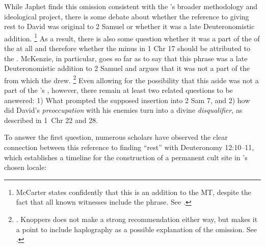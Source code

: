 While Japhet finds this omission consistent with the \chronicler's broader methodology and ideological project,%
    \autocite[328]{japhet1993}
there is some debate about whether the reference to \yahweh giving rest to David was original to 2 Samuel or whether it was a late Deuteronomistic addition.%
    \footnote{McCarter states confidently that this is an addition to the MT, despite the fact that all known witnesses include the phrase. See \cite[191]{mccarter1984}.}
As a result, there is also some question whether it was a part of the \vorlage of the \chronicler at all and therefore whether the minus in 1 Chr 17 should be attributed to the \chronicler. McKenzie, in particular, goes so far as to say that this phrase was a late Deuteronomistic addition to 2 Samuel and argues that it was not a part of the \vorlage from which the \chronicler drew.%
    \footnote{\Cite[63]{mckenzie1985}. Knoppers does not make a strong recommendation either way, but makes it a point to include haplography as a possible explanation of the omission. See \cite[666]{knoppers2007}.}
Even allowing for the possibility that this aside was not a part of the \chronicler's \vorlage, however, there remain at least two related questions to be answered: 1) What prompted the supposed insertion into 2 Sam 7, and 2) how did David's \emph{preoccupation} with his enemies turn into a divine \emph{disqualifier}, as described in 1~Chr 22 and 28.

To answer the first question, numerous scholars have observed the clear connection between this reference to finding ``rest'' with Deuteronomy 12:10--11, which establishes a timeline for the construction of a permanent cult site in \yahweh's chosen locale:

